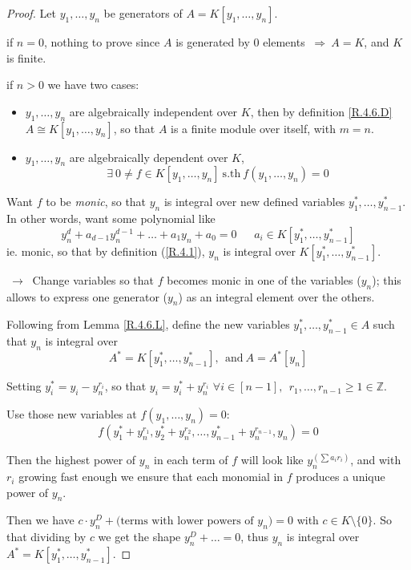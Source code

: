 \documentclass{article}
\theoremstyle{definition}
\begin{document}
\begin{proof}
  Let $y_1, \ldots, y_n$ be generators of $A = K[y_1, \ldots, y_n]$.

  if $n=0$, nothing to prove since $A$ is generated by $0$ elements $~\Longrightarrow~ A=K$, and $K$ is finite.

  if $n>0$ we have two cases:
  \begin{itemize}
    \item[-] $y_1, \ldots, y_n$ are algebraically independent over $K$, then by
      definition \ref{R.4.6.D} $A \cong K[y_1, \ldots, y_n]$, so that $A$ is a finite module over itself, with $m=n$.
    \item[-] $y_1, \ldots, y_n$ are algebraically dependent over $K$,
      $$\exists~ 0 \neq f \in K[y_1, \ldots, y_n] ~\text{s.th}~ f(y_1, \ldots, y_n)=0$$
  \end{itemize}

  Want $f$ to be \emph{monic}, so that $y_n$ is integral over new defined variables $y_1^*, \ldots, y_{n-1}^*$. In other words, want some polynomial like
  $$y_n^d+ a_{d-1} y_n^{d-1} + \ldots + a_1 y_n + a_0 = 0~~~~~~~a_i \in K[y_1^*,
  \ldots, y_{n-1}^*]$$
  \hspace*{2em} ie. monic, so that by definition (\ref{R.4.1}), $y_n$ is
  integral over $K[y_1^*, \ldots, y_{n-1}^*]$.

  $~\longrightarrow~$ Change variables so that $f$ becomes monic in one of the variables ($y_n$); this allows to express one generator ($y_n$) as an integral element over the others.


  \vspace{0.3cm}
  Following from Lemma \ref{R.4.6.L}, define the new variables $y^*_1, \ldots, y^*_{n-1} \in A$ such that $y_n$ is integral over
  $$A^* = K[y^*_1, \ldots, y^*_{n-1}], ~~\text{and}~ A=A^*[y_n]$$

  Setting $y_i^* = y_i - y_n^{r_i}$, so that $y_i = y_i^* + y_n^{r_i}$ $\forall i \in [n-1],~~ r_1, \ldots, r_{n-1} \geq 1 \in \mathbb{Z}$.

  Use those new variables at $f(y_1, \ldots, y_n)=0$:
  $$f(y_1^* + y_n^{r_1}, y_2^* + y_n^{r_2}, \ldots, y_{n-1}^* + y_n^{r_{n-1}}, y_n) = 0$$

  Then the highest power of $y_n$ in each term of $f$ will look like $y_n^{(\sum a_i r_i)}$, and with $r_i$ growing fast enough we ensure that each monomial in $f$ produces a unique power of $y_n$.

  Then we have $c \cdot y_n^D + \text{(terms with lower powers of $y_n$)} = 0$ with $c \in K \setminus \{0\}$. So that dividing by $c$ we get the shape $y_n^D + \ldots =0$, thus $y_n$ is integral over $A^* = K[y_1^*, \ldots, y_{n-1}^*]$.


\end{proof}
\end{document}
